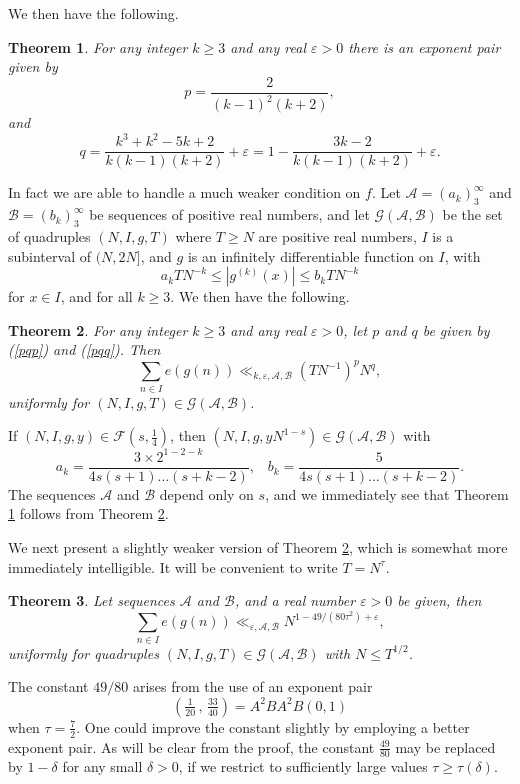 \documentclass[a4paper,10pt]{article}
\newcommand{\ep}{\varepsilon}
\newcommand{\beql}[1]{\begin{equation}\label{#1}}
\newcommand{\eeq}{\end{equation}}
\newtheorem{theorem}{Theorem}
\begin{document}
We then have the following.
\begin{theorem}\label{EP}
For any integer $k\ge 3$ and any real $\ep>0$ there is an exponent 
pair given by
\beql{pqp}
p=\frac{2}{(k-1)^2(k+2)},
\eeq
and
\beql{pqq}
q=\frac{k^3+k^2-5k+2}{k(k-1)(k+2)}+\ep
=1-\frac{3k-2}{k(k-1)(k+2)}+\ep.
\eeq
\end{theorem}

In fact we are able to handle a much weaker condition on $f$. Let
$\mathcal{A}=(a_k)_3^\infty$ and $\mathcal{B}=(b_k)_3^\infty$ be
sequences of  positive real numbers, and let
$\mathcal{G}(\mathcal{A},\mathcal{B})$ be the set of
quadruples $(N,I,g,T)$ where $T\ge N$ are positive real numbers, $I$
is a subinterval of $(N,2N]$, and $g$ is an infinitely differentiable
function on $I$, with 
\[a_kTN^{-k}\le\left|g^{(k)}(x)\right|\le b_k TN^{-k}\]
for $x\in I$, and for all $k\ge 3$. We then have the following.
\begin{theorem}\label{EP0}
For any integer $k\ge 3$ and any real $\ep>0$, let $p$ and $q$ be given
by (\ref{pqp}) and (\ref{pqq}). Then
\[\sum_{n\in I}e(g(n))\ll_{k,\ep,\mathcal{A},\mathcal{B}} (TN^{-1})^p N^q,\]
uniformly for $(N,I,g,T)\in\mathcal{G}(\mathcal{A},\mathcal{B})$.
\end{theorem}
If $(N,I,g,y)\in\mathcal{F}(s,\tfrac14)$, then
$(N,I,g,yN^{1-s})\in\mathcal{G}(\mathcal{A},\mathcal{B})$ with
\[a_k=\frac{3\times 2^{1-2-k}}{4s(s+1)\ldots(s+k-2)},\;\;\;
b_k=\frac{5}{4s(s+1)\ldots(s+k-2)}.\]
The sequences $\mathcal{A}$ and $\mathcal{B}$ depend only on $s$, and
we immediately see that Theorem \ref{EP} follows from Theorem \ref{EP0}.

We next present a slightly weaker version of Theorem \ref{EP0}, which is
somewhat more immediately intelligible. It will be convenient to write
$T=N^{\tau}$. 
\begin{theorem}\label{EP1}
Let sequences $\mathcal{A}$ and $\mathcal{B}$, and a real number
$\ep>0$ be given, then
\[\sum_{n\in I}e(g(n))\ll_{\ep,\mathcal{A},\mathcal{B}} N^{1-49/(80\tau^2)+\ep},\]
uniformly for quadruples
$(N,I,g,T)\in\mathcal{G}(\mathcal{A},\mathcal{B})$ with $N\le T^{1/2}$.
\end{theorem}
The constant $49/80$ arises from the use of an exponent pair
\[(\tfrac{1}{20}\,,\,\tfrac{33}{40})=A^2BA^2B(0,1)\]
when $\tau=\tfrac72$. One could improve the constant slightly by employing a
better exponent pair. As will be clear from the proof, the constant
$\tfrac{49}{80}$ may be replaced by $1-\delta$ for any small
$\delta>0$, if we restrict to sufficiently large values
$\tau\ge\tau(\delta)$. 
\end{document}
